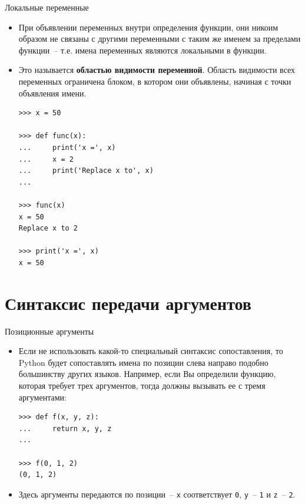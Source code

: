 \documentclass[aspectratio=169, mathserif]{beamer}%
\begin{document}
\begin{frame}[fragile]{Локальные переменные}
\scriptsize
\begin{itemize}
\item При объявлении переменных внутри определения функции, они никоим образом не связаны с другими переменными с таким же именем за пределами функции~-- т.е. имена переменных являются локальными в функции. 
\item Это называется \textcolor{extraorange}{\textbf{областью видимости переменной}}. Область видимости всех переменных ограничена блоком, в котором они объявлены, начиная с точки объявления имени.

\begin{verbatim}
>>> x = 50

>>> def func(x):
...     print('x =', x)
...     x = 2
...     print('Replace x to', x)
...

>>> func(x)
x = 50
Replace x to 2

>>> print('x =', x)
x = 50
\end{verbatim}
\end{itemize}
\vfill
\end{frame}


\section{Синтаксис передачи аргументов}
\sectionframe

\begin{frame}[fragile]{Позиционные аргументы}
\scriptsize
\begin{itemize}
\item Если не использовать какой-то специальный синтаксис сопоставления, то Python будет сопоставлять имена по позиции слева направо подобно большинству других языков. Например, если Вы определили функцию, которая требует трех аргументов, тогда должны вызывать ее с тремя аргументами:

\begin{verbatim}
>>> def f(x, y, z):
...     return x, y, z
...

>>> f(0, 1, 2)
(0, 1, 2)
\end{verbatim}
\item Здесь аргументы передаются по позиции~-- \texttt{x} соответствует \texttt{0}, \texttt{y}~-- \texttt{1} и \texttt{z}~-- \texttt{2}.
\end{itemize}
\vfill
\end{frame}
\end{document}
